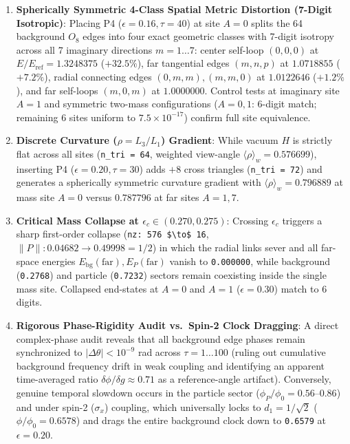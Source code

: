 \documentclass[
  a4paper,
]{article}
\providecommand{\tightlist}{%
  \setlength{\itemsep}{0pt}\setlength{\parskip}{0pt}}
\begin{document}
\begin{enumerate}
\def\labelenumi{\arabic{enumi}.}
\tightlist
\item
  \textbf{Spherically Symmetric 4-Class Spatial Metric Distortion
  (7-Digit Isotropic)}: Placing P4 (\(\epsilon = 0.16, \tau = 40\)) at
  site \(A = 0\) splits the 64 background \(O_8\) edges into four exact
  geometric classes with 7-digit isotropy across all 7 imaginary
  directions \(m = 1 \dots 7\): center self-loop \((0,0,0)\) at
  \(E/E_{\mathrm{ref}} = 1.3248375\) (\(+32.5\%\)), far tangential edges
  \((m,n,p)\) at \(1.0718855\) (\(+7.2\%\)), radial connecting edges
  \((0,m,m), (m,m,0)\) at \(1.0122646\) (\(+1.2\%\)), and far self-loops
  \((m,0,m)\) at \(1.0000000\). Control tests at imaginary site
  \(A = 1\) and symmetric two-mass configurations (\(A = 0, 1\): 6-digit
  match; remaining 6 sites uniform to \(7.5 \times 10^{-17}\)) confirm
  full site equivalence.
\item
  \textbf{Discrete Curvature (\(\rho = L_3/L_1\)) Gradient}: While
  vacuum \(H\) is strictly flat across all sites
  (\texttt{n\_tri\ =\ 64}, weighted view-angle
  \(\langle\rho\rangle_w = 0.576699\)), inserting P4
  (\(\epsilon = 0.20, \tau = 30\)) adds \(+8\) cross triangles
  (\texttt{n\_tri\ =\ 72}) and generates a spherically symmetric
  curvature gradient with \(\langle\rho\rangle_w = 0.796889\) at mass
  site \(A = 0\) versus \(0.787796\) at far sites \(A = 1, 7\).
\item
  \textbf{Critical Mass Collapse at \(\epsilon_c \in (0.270, 0.275)\)}:
  Crossing \(\epsilon_c\) triggers a sharp first-order collapse
  (\texttt{nz:\ 576\ \$\textbackslash{}to\$\ 16},
  \(\|P\|: 0.04682 \to 0.49998 = 1/2\)) in which the radial links sever
  and all far-space energies
  \(E_{\mathrm{bg}}(\mathrm{far}), E_P(\mathrm{far})\) vanish to
  \texttt{0.000000}, while background (\texttt{0.2768}) and particle
  (\texttt{0.7232}) sectors remain coexisting inside the single mass
  site. Collapsed end-states at \(A = 0\) and \(A = 1\)
  (\(\epsilon = 0.30\)) match to 6 digits.
\item
  \textbf{Rigorous Phase-Rigidity Audit vs.~Spin-2 Clock Dragging}: A
  direct complex-phase audit reveals that all background edge phases
  remain synchronized to \(|\Delta\theta| < 10^{-9}\) rad across
  \(\tau = 1 \dots 100\) (ruling out cumulative background frequency
  drift in weak coupling and identifying an apparent time-averaged ratio
  \(\delta\phi/\delta g \approx 0.71\) as a reference-angle artifact).
  Conversely, genuine temporal slowdown occurs in the particle sector
  (\(\phi_P/\phi_0 = 0.56\)--\(0.86\)) and under spin-2 (\(\sigma_x\))
  coupling, which universally locks to \(d_1 = 1/\sqrt{2}\)
  (\(\phi/\phi_0 = 0.6578\)) and drags the entire background clock down
  to \texttt{0.6579} at \(\epsilon = 0.20\).
\end{enumerate}
\end{document}
